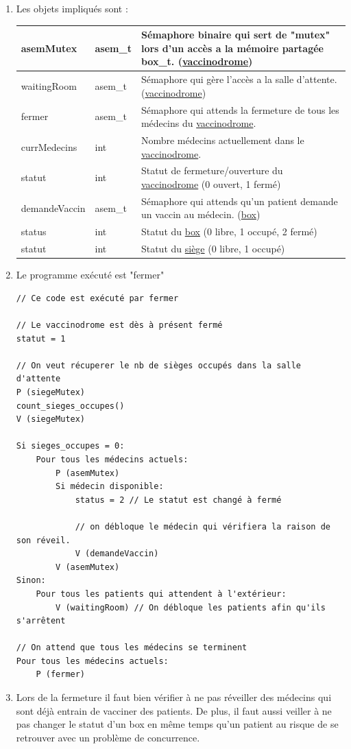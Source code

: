 \documentclass[a4paper]{article}
\begin{document}
  \begin{enumerate}
    \item Les objets impliqués sont :

    \begin{tabularx}{\linewidth}{|l|l|>{\strut}X|}
      \hline%
    asemMutex & asem\_t & Sémaphore binaire qui sert de "mutex" lors d'un accès a la mémoire partagée box\_t. (\underline{vaccinodrome}) \\ \hline%
    waitingRoom & asem\_t & Sémaphore qui gère l'accès a la salle d'attente. (\underline{vaccinodrome}) \\ \hline%
    fermer & asem\_t & Sémaphore qui attends la fermeture de tous les médecins du \underline{vaccinodrome}. \\ \hline%
    currMedecins & int & Nombre médecins actuellement dans le \underline{vaccinodrome}. \\ \hline%
    statut & int & Statut de fermeture/ouverture du \underline{vaccinodrome} (0 ouvert, 1 fermé) \\ \hline%

  demandeVaccin & asem\_t & Sémaphore qui attends qu'un patient demande un vaccin au médecin. (\underline{box}) \\ \hline%
status & int & Statut du \underline{box} (0 libre, 1 occupé, 2 fermé) \\ \hline%
 statut & int & Statut du \underline{siège} (0 libre, 1 occupé) \\ \hline%
    \end{tabularx}

  \item Le programme exécuté est "fermer"

\begin{verbatim}
// Ce code est exécuté par fermer

// Le vaccinodrome est dès à présent fermé
statut = 1

// On veut récuperer le nb de sièges occupés dans la salle d'attente
P (siegeMutex)
count_sieges_occupes()
V (siegeMutex)

Si sieges_occupes = 0:
    Pour tous les médecins actuels:
        P (asemMutex)
        Si médecin disponible:
            status = 2 // Le statut est changé à fermé

            // on débloque le médecin qui vérifiera la raison de son réveil.
            V (demandeVaccin)
        V (asemMutex)
Sinon:
    Pour tous les patients qui attendent à l'extérieur:
        V (waitingRoom) // On débloque les patients afin qu'ils s'arrêtent

// On attend que tous les médecins se terminent
Pour tous les médecins actuels:
    P (fermer)

\end{verbatim}

  \item Lors de la fermeture il faut bien vérifier à ne pas réveiller des médecins qui sont déjà entrain de vacciner des patients. De plus, il faut aussi veiller à ne pas changer le statut d'un box en même temps qu'un patient au risque de se retrouver avec un problème de concurrence.
  \end{enumerate}
\newpage
\end{document}
